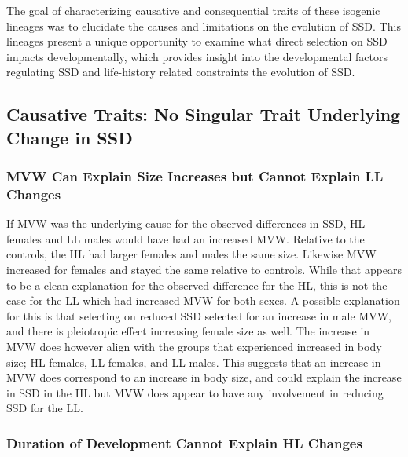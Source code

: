 \documentclass[12pt,reqno,oneside]{report}
\begin{document}
The goal of characterizing causative and consequential traits of these isogenic lineages was to elucidate the causes and limitations on the evolution of SSD. This lineages present a unique opportunity to examine what direct selection on SSD impacts developmentally, which provides insight into the developmental factors regulating SSD and life-history related constraints the evolution of SSD. 

\subsection{Causative Traits: No Singular Trait Underlying Change in SSD}

\subsubsection{MVW Can Explain Size Increases but Cannot Explain LL Changes}

If MVW was the underlying cause for the observed differences in SSD, HL females and LL males would have had an increased MVW. Relative to the controls, the HL had larger females and males the same size. Likewise MVW increased for females and stayed the same relative to controls. While that appears to be a clean explanation for the observed difference for the HL, this is not the case for the LL which had increased MVW for both sexes. A possible explanation for this is that selecting on reduced SSD selected for an increase in male MVW, and there is pleiotropic effect increasing female size as well. The increase in MVW does however align with the groups that experienced increased in body size; HL females, LL females, and LL males. This suggests that an increase in MVW does correspond to an increase in body size, and could explain the increase in SSD in the HL but MVW does appear to have any involvement in reducing SSD for the LL.

\subsubsection{Duration of Development Cannot Explain HL Changes}
\end{document}

